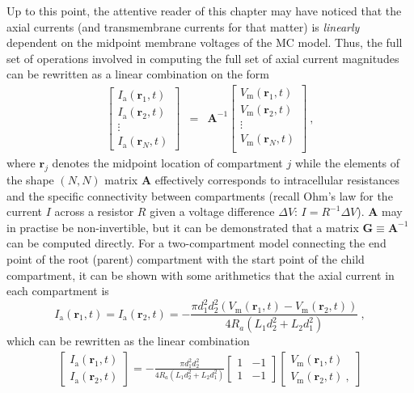 Up to this point, the attentive reader of this chapter may have noticed that the axial currents (and transmembrane currents for that matter) is \textit{linearly} dependent on the midpoint membrane voltages of the MC model. 
Thus, the full set of operations involved in computing the full set of axial current magnitudes can be rewritten as a linear combination on the form
%
\begin{eqnarray}
\begin{bmatrix}
I_\mathrm{a}(\mathbf{r}_1, t)\\
I_\mathrm{a}(\mathbf{r}_2, t)\\
\vdots \\
I_\mathrm{a}(\mathbf{r}_N, t)
\end{bmatrix}
&=& \mathbf{A}^{-1} 
\begin{bmatrix}
V_\mathrm{m}(\mathbf{r}_1, t)\\
V_\mathrm{m}(\mathbf{r}_2, t)\\
\vdots \\
V_\mathrm{m}(\mathbf{r}_N, t)\\
\end{bmatrix} ~,
\label{eq:LFPy_linear_combination}
\end{eqnarray}
%
where $\mathbf{r}_j$ denotes the midpoint location of compartment $j$ while the elements of the shape $(N, N)$ matrix $\mathbf{A}$ effectively corresponds to intracellular resistances and the specific connectivity between compartments
(recall Ohm's law for the current $I$ across a resistor $R$ given a voltage difference $\Delta V$: $I=R^{-1} \Delta V$). 
$\mathbf{A}$ may in practise be non-invertible, 
but it can be demonstrated that a matrix $\mathbf{G}\equiv \mathbf{A}^{-1}$ can be computed directly. 
%
For a two-compartment model connecting the end point of the root (parent) compartment with the start point of the child compartment, 
it can be shown with some arithmetics that the axial current in each compartment is 
%
\begin{equation}
I_\mathrm{a}(\mathbf{r}_1, t) = I_\mathrm{a}(\mathbf{r}_2, t) = 
	- \frac{\pi d_{1}^{2} d_{2}^{2} \left(V_\mathrm{m}(\mathbf{r}_1, t) - V_\mathrm{m}(\mathbf{r}_2, t) \right)}{4 R_{a} \left(L_{1} d_{2}^{2} + L_{2} d_{1}^{2}\right)} ~,
\end{equation}
%
which can be rewritten as the linear combination
% 
\begin{eqnarray}
\begin{bmatrix}
I_\mathrm{a}(\mathbf{r}_1, t)\\
I_\mathrm{a}(\mathbf{r}_2, t)
\end{bmatrix} 
=
- \frac{\pi d_{1}^{2} d_{2}^{2}}{4 R_{a} \left(L_{1} d_{2}^{2} + L_{2} d_{1}^{2}\right)}
\begin{bmatrix}
1 & -1 \\ 
1 & -1 
\end{bmatrix}
\begin{bmatrix}
V_\mathrm{m}(\mathbf{r}_1, t) \\
V_\mathrm{m}(\mathbf{r}_2, t) ~, 
\end{bmatrix}
\end{eqnarray}
